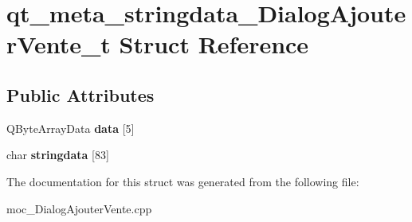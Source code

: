 \section{qt\-\_\-meta\-\_\-stringdata\-\_\-\-Dialog\-Ajouter\-Vente\-\_\-t Struct Reference}
\label{structqt__meta__stringdata___dialog_ajouter_vente__t}
\subsection*{Public Attributes}
\begin{DoxyCompactItemize}
\item 
Q\-Byte\-Array\-Data {\bfseries data} [5]\label{structqt__meta__stringdata___dialog_ajouter_vente__t_ab7b9b541a6919479c9458891ce01fa3b}

\item 
char {\bfseries stringdata} [83]\label{structqt__meta__stringdata___dialog_ajouter_vente__t_a966a4f6f9fd27b70a25a1ed0e763431c}

\end{DoxyCompactItemize}


The documentation for this struct was generated from the following file\-:\begin{DoxyCompactItemize}
\item 
moc\-\_\-\-Dialog\-Ajouter\-Vente.\-cpp\end{DoxyCompactItemize}
